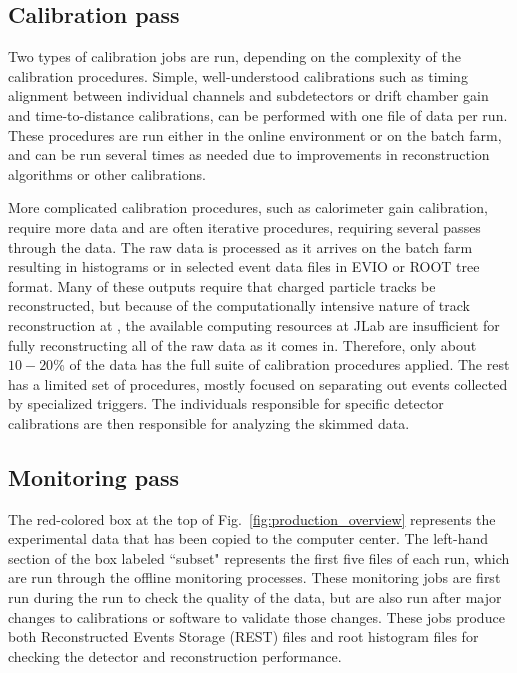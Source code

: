 \subsection{Calibration pass \label{sec:reccalibration}}

Two types of calibration jobs are run, depending on the complexity of the calibration procedures.  Simple, well-understood calibrations such as timing alignment between individual channels and subdetectors or drift chamber gain and time-to-distance calibrations, can be performed with one file of data per run.  These procedures are run either in the online environment or on the batch farm, and can be run several times as needed due to improvements in reconstruction algorithms or other calibrations.

More complicated calibration procedures, such as calorimeter gain calibration, require more data and are often iterative procedures, requiring several passes through the data.  The raw data is processed as it arrives on the batch farm resulting in histograms or in selected event data files in EVIO or ROOT tree format.  Many of these outputs require that charged particle tracks be reconstructed, but because of the computationally intensive nature of track reconstruction at \GX, the available computing resources at JLab are insufficient for fully reconstructing all of the raw data as it comes in.  Therefore, only about $10-20$\% of the data has the full suite of calibration procedures applied.  The rest has a limited set of procedures, mostly focused on separating out events collected by specialized triggers. 
The individuals responsible for specific detector calibrations are then responsible for analyzing the skimmed data.

\subsection{Monitoring pass \label{sec:recmonitoring}}

The red-colored box at the top of Fig.~\ref{fig:production_overview} represents the experimental data that has been copied to the computer center. The left-hand section of the box labeled ``subset" represents the first five files of each run, which are run through the offline monitoring processes. These monitoring jobs are first run during the run to check the quality of the data, but are also run after major changes to calibrations or software to validate those changes. These jobs produce both Reconstructed Events Storage (REST) files and root histogram files for checking the detector and reconstruction performance.

